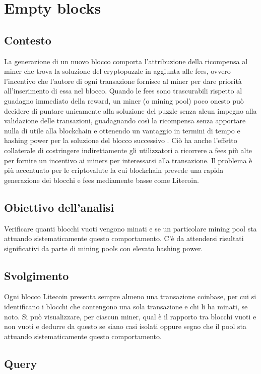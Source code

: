 \section{Empty blocks}
\subsection{Contesto}
La generazione di un nuovo blocco comporta l’attribuzione della ricompensa al miner che trova la soluzione del cryptopuzzle in aggiunta alle fees, ovvero l’incentivo che l’autore di ogni transazione fornisce al miner per dare priorità all’inserimento di essa nel blocco.
Quando le fees sono trascurabili rispetto al guadagno immediato della reward, un miner (o mining pool) poco onesto può decidere di puntare unicamente alla soluzione del puzzle senza alcun impegno alla validazione delle transazioni, guadagnando così la ricompensa senza apportare nulla di utile alla blockchain e ottenendo un vantaggio in termini di tempo e hashing power per la soluzione del blocco successivo \cite{empty}. Ciò ha anche l’effetto collaterale di costringere indirettamente gli utilizzatori a ricorrere a fees più alte per fornire un incentivo ai miners per interessarsi alla transazione.
Il problema è più accentuato per le criptovalute la cui blockchain prevede una rapida generazione dei blocchi e fees mediamente basse come Litecoin.

\subsection{Obiettivo dell’analisi}
Verificare quanti blocchi vuoti vengono minati e se un particolare mining pool sta attuando sistematicamente questo comportamento.
C’è da attendersi risultati significativi da parte di mining pools con elevato hashing power.

\subsection{Svolgimento}
Ogni blocco Litecoin presenta sempre almeno una transazione coinbase, per cui si identificano i blocchi che contengono una sola transazione e chi li ha minati, se noto. Si può visualizzare, per ciascun miner, qual è il rapporto tra blocchi vuoti e non vuoti e dedurre da questo se siano casi isolati oppure segno che il pool sta attuando sistematicamente questo comportamento.

\subsection{Query}

